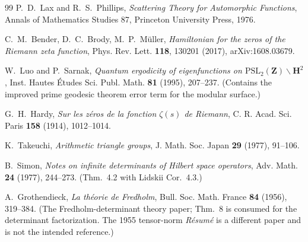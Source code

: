 \documentclass[11pt]{amsart}
\theoremstyle{remark}
\begin{document}
\begin{thebibliography}{99}
 P.~D.~Lax and R.~S.~Phillips, \emph{Scattering
Theory for Automorphic Functions}, Annals of Mathematics Studies 87,
Princeton University Press, 1976. %

 C.~M.~Bender, D.~C.~Brody, M.~P.~M\"uller,
\emph{Hamiltonian for the zeros of the Riemann zeta function}, Phys.
Rev. Lett. \textbf{118}, 130201 (2017), arXiv:1608.03679.

 W.~Luo and P.~Sarnak, \emph{Quantum ergodicity
of eigenfunctions on $\mathrm{PSL}_2(\mathbf{Z})\backslash\mathbf{H}^2$},
Inst. Hautes \'Etudes Sci. Publ. Math. \textbf{81} (1995), 207--237.
(Contains the improved prime geodesic theorem error term for the modular
surface.)

 G.~H.~Hardy, \emph{Sur les z\'eros de la fonction
$\zeta(s)$ de Riemann}, C. R. Acad. Sci. Paris \textbf{158} (1914),
1012--1014.

 K.~Takeuchi, \emph{Arithmetic triangle groups},
J. Math. Soc. Japan \textbf{29} (1977), 91--106.

 B.~Simon, \emph{Notes on infinite determinants of
Hilbert space operators}, Adv. Math. \textbf{24} (1977), 244--273. (Thm.\
4.2 with Lidskii Cor.\ 4.3.)

 A.~Grothendieck, \emph{La th\'eorie de
Fredholm}, Bull. Soc. Math. France \textbf{84} (1956), 319--384. (The Fredholm-determinant theory paper; Thm.~8 is consumed for the
determinant factorization. The 1955 tensor-norm \emph{R\'esum\'e} is a
different paper and is not the intended reference.)

\end{thebibliography}
\end{document}

